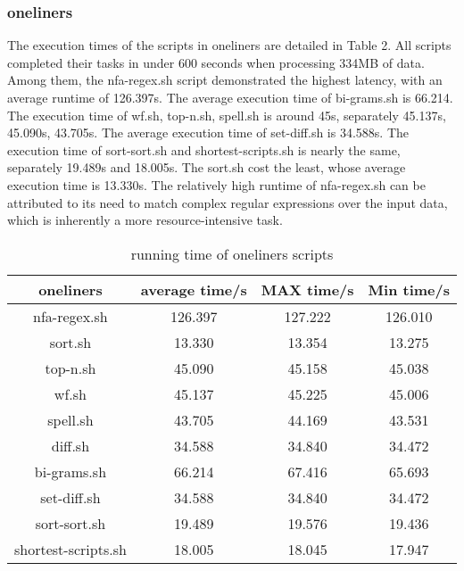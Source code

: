 \documentclass[sigplan, screen, 10pt]{acmart}
\begin{document}
\subsubsection{oneliners}
The execution times of the scripts in oneliners are detailed in Table 2.
All scripts completed their tasks in under 600 seconds when processing 334MB of data.
Among them, the nfa-regex.sh script demonstrated the highest latency, with an average runtime of 126.397s.
The average execution time of bi-grams.sh is 66.214.
The execution time of wf.sh, top-n.sh, spell.sh is around 45s, separately 45.137s, 45.090s, 43.705s.
The average execution time of set-diff.sh is 34.588s.
The execution time of sort-sort.sh and shortest-scripts.sh is nearly the same, separately 19.489s and 18.005s.
The sort.sh cost the least, whose average execution time is 13.330s.\newline
The relatively high runtime of nfa-regex.sh can be attributed to its need to match complex regular expressions over the input data, which is inherently a more resource-intensive task.
\begin{table}[]
    \centering
    \begin{tabular}{c|c|c|c}
        \textbf{oneliners}& \textbf{average time/s} & \textbf{MAX time/s} & \textbf{Min time/s} \\
         \hline
         nfa-regex.sh & 126.397 & 127.222 & 126.010 \\
         sort.sh & 13.330 & 13.354 & 13.275 \\
         top-n.sh & 45.090 & 45.158 & 45.038 \\
         wf.sh & 45.137 & 45.225 & 45.006 \\
         spell.sh & 43.705 & 44.169 & 43.531 \\
         diff.sh & 34.588 & 34.840 & 34.472 \\
         bi-grams.sh & 66.214 & 67.416 & 65.693\\
         set-diff.sh & 34.588 & 34.840 & 34.472\\
         sort-sort.sh & 19.489 & 19.576 & 19.436 \\
         shortest-scripts.sh & 18.005 & 18.045 & 17.947\\
         \hline
    \end{tabular}
    \caption{running time of oneliners scripts}
\end{table}
\end{document}
